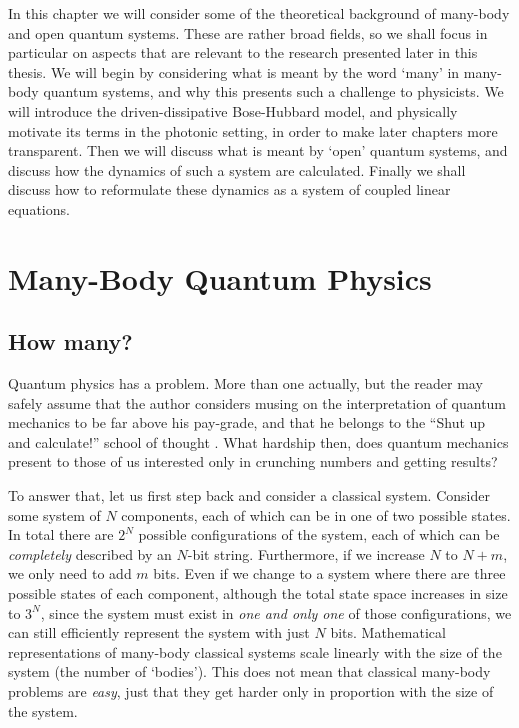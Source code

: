 In this chapter we will consider some of the theoretical background of many-body and open quantum systems. These are rather broad fields, so we shall focus in particular on aspects that are relevant to the research presented later in this thesis. We will begin by considering what is meant by the word `many' in many-body quantum systems, and why this presents such a challenge to physicists. We will introduce the driven-dissipative Bose-Hubbard model, and physically motivate its terms in the photonic setting, in order to make later chapters more transparent. Then we will discuss what is meant by `open' quantum systems, and discuss how the dynamics of such a system are calculated. Finally we shall discuss how to reformulate these dynamics as a system of coupled linear equations.  

\section{Many-Body Quantum Physics}

\subsection{How many?}
Quantum physics has a problem. More than one actually, but the reader may safely assume that the author considers musing on the interpretation of quantum mechanics to be far above his pay-grade, and that he belongs to the ``Shut up and calculate!'' school of thought \cite{Mermin89}. What hardship then, does quantum mechanics present to those of us interested only in crunching numbers and getting results? 

To answer that, let us first step back and consider a classical system. Consider some system of \(N\) components, each of which can be in one of two possible states. In total there are \(2^{N}\) possible configurations of the system, each of which can be \emph{completely} described by an \(N\)-bit string. Furthermore, if we increase \(N\) to \(N+m\), we only need to add \(m\) bits. Even if we change to a system where there are three possible states of each component, although the total state space increases in size to \(3^{N}\), since the system must exist in \emph{one and only one} of those configurations, we can still efficiently represent the system with just \(N\) bits. Mathematical representations of many-body classical systems scale linearly with the size of the system (the number of `bodies'). This does not mean that classical many-body problems are \emph{easy}, just that they get harder only in proportion with the size of the system.  

